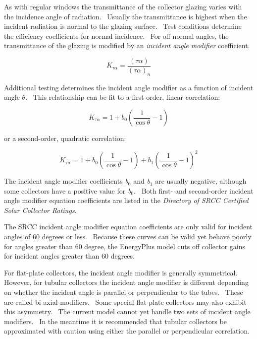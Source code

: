 As with regular windows the transmittance of the collector glazing varies with the incidence angle of radiation.~ Usually the transmittance is highest when the incident radiation is normal to the glazing surface.~ Test conditions determine the efficiency coefficients for normal incidence.~ For off-normal angles, the transmittance of the glazing is modified by an \emph{incident angle modifier} coefficient.

\begin{equation}
{K_{\tau \alpha }} = \frac{{\left( {\tau \alpha } \right)}}{{{{\left( {\tau \alpha } \right)}_n}}}
\end{equation}

Additional testing determines the incident angle modifier as a function of incident angle \(\theta\).~ This relationship can be fit to a first-order, linear correlation:

\begin{equation}
{K_{\tau \alpha }} = 1 + {b_0}\left( {\frac{1}{{\cos \theta }} - 1} \right)
\end{equation}

or a second-order, quadratic correlation:

\begin{equation}
{K_{\tau \alpha }} = 1 + {b_0}\left( {\frac{1}{{\cos \theta }} - 1} \right) + {b_1}{\left( {\frac{1}{{\cos \theta }} - 1} \right)^2}
\end{equation}

The incident angle modifier coefficients \emph{b\(_{0}\)} and \emph{b\(_{1}\)} are usually negative, although some collectors have a positive value for \emph{b\(_{0}\)}.~ Both first- and second-order incident angle modifier equation coefficients are listed in the \emph{Directory of SRCC Certified Solar Collector Ratings}.

The SRCC incident angle modifier equation coefficients are only valid for incident angles of 60 degrees or less.~ Because these curves can be valid yet behave poorly for angles greater than 60 degree, the EnergyPlus model cuts off collector gains for incident angles greater than 60 degrees.

For flat-plate collectors, the incident angle modifier is generally symmetrical.~ However, for tubular collectors the incident angle modifier is different depending on whether the incident angle is parallel or perpendicular to the tubes.~ These are called bi-axial modifiers.~ Some special flat-plate collectors may also exhibit this asymmetry.~ The current model cannot yet handle two sets of incident angle modifiers.~ In the meantime it is recommended that tubular collectors be approximated with caution using either the parallel or perpendicular correlation.

